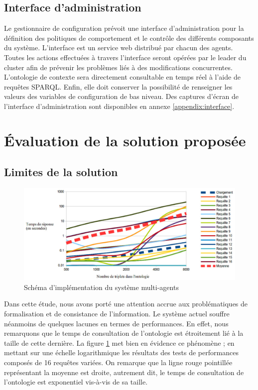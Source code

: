 \subsection{Interface d'administration}

Le gestionnaire de configuration prévoit une interface d'administration
pour la définition des politiques de comportement et le contrôle des différents
composants du système. L'interface est un service web distribué par
chacun des agents. Toutes les actions effectuées à travers l'interface seront
opérées par le leader du cluster afin de prévenir les problèmes liés à des
modifications concurrentes. L'ontologie de contexte sera directement
consultable en temps réel à l'aide de requêtes SPARQL. Enfin, elle doit
conserver la possibilité de renseigner les valeurs des variables de
configuration de bas niveau. Des captures d'écran de l'interface
d'administration sont disponibles en annexe \ref{appendix:interface}.

\section{Évaluation de la solution proposée}

\subsection{Limites de la solution}

\begin{figure}[H]
    \centering
    \includegraphics[width=\textwidth]{img/chart_sparql}
    \caption{Schéma d'implémentation du système multi-agents}
    \label{fig:chart}
\end{figure}

Dans cette étude, nous avons porté une attention accrue aux problématiques de
formalisation et de consistance de l'information. Le système actuel souffre
néanmoins de quelques lacunes en termes de performances. En effet, nous
remarquons que le temps de consultation de l'ontologie est étroitement lié à
la taille de cette dernière. La figure \ref{fig:chart} met bien en évidence ce
phénomène ; en mettant sur une échelle logarithmique les résultats des tests de
performances composés de 16 requêtes variées. On remarque que la ligne
rouge pointillée représentant la moyenne est droite, autrement dit, le temps de
consultation de l'ontologie est exponentiel vis-à-vis de sa taille.

